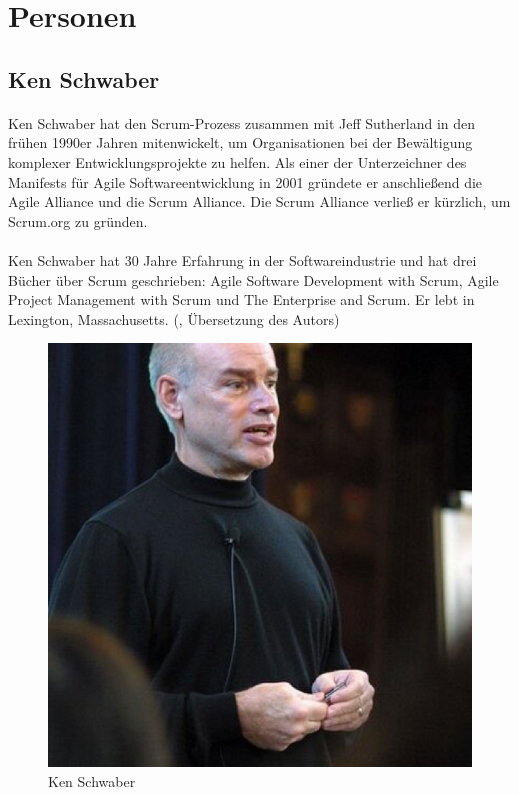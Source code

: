 \documentclass{article}
\begin{document}
\pagebreak

\section{Personen}
\subsection{Ken Schwaber}
\paragraph{}
Ken Schwaber hat den Scrum-Prozess zusammen mit Jeff Sutherland in den frühen 1990er Jahren mitenwickelt, um Organisationen bei der Bewältigung komplexer Entwicklungsprojekte zu helfen. Als einer der Unterzeichner des Manifests für Agile Softwareentwicklung in 2001 gründete er anschließend die Agile Alliance und die Scrum Alliance. Die Scrum Alliance verließ er kürzlich, um Scrum.org zu gründen.

\paragraph{}
Ken Schwaber hat 30 Jahre Erfahrung in der Softwareindustrie und hat drei Bücher über Scrum geschrieben: \glqq Agile Software Development with Scrum\grqq{}, \glqq Agile Project Management with Scrum\grqq{} und \glqq The Enterprise and Scrum\grqq{}. Er lebt in Lexington, Massachusetts. (\cite{ken}, Übersetzung des Autors)

\begin{figure}[h]
  \centering
  \includegraphics[scale=.45]{img/ken.png}
  \caption{Ken Schwaber}
  \label{kenpng}
\end{figure}
\end{document}
